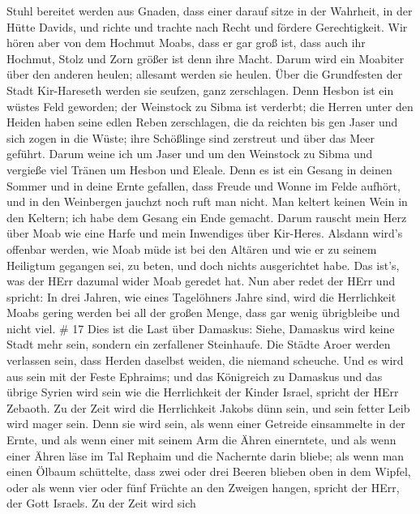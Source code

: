 Stuhl bereitet werden aus Gnaden, dass einer darauf sitze in der
Wahrheit, in der Hütte Davids, und richte und trachte nach Recht und
fördere Gerechtigkeit.  Wir hören aber von dem Hochmut
Moabs, dass er gar groß ist, dass auch ihr Hochmut, Stolz und Zorn
größer ist denn ihre Macht.  Darum wird ein Moabiter über
den anderen heulen; allesamt werden sie heulen. Über die Grundfesten der
Stadt Kir-Hareseth werden sie seufzen, ganz zerschlagen. 
Denn Hesbon ist ein wüstes Feld geworden; der Weinstock zu Sibma ist
verderbt; die Herren unter den Heiden haben seine edlen Reben
zerschlagen, die da reichten bis gen Jaser und sich zogen in die Wüste;
ihre Schößlinge sind zerstreut und über das Meer geführt. 
Darum weine ich um Jaser und um den Weinstock zu Sibma und vergieße viel
Tränen um Hesbon und Eleale. Denn es ist ein Gesang in deinen Sommer und
in deine Ernte gefallen,  dass Freude und Wonne im Felde
aufhört, und in den Weinbergen jauchzt noch ruft man nicht. Man keltert
keinen Wein in den Keltern; ich habe dem Gesang ein Ende gemacht.
 Darum rauscht mein Herz über Moab wie eine Harfe und mein
Inwendiges über Kir-Heres.  Alsdann wird's offenbar werden,
wie Moab müde ist bei den Altären und wie er zu seinem Heiligtum
gegangen sei, zu beten, und doch nichts ausgerichtet habe. 
Das ist's, was der HErr dazumal wider Moab geredet hat. 
Nun aber redet der HErr und spricht: In drei Jahren, wie eines
Tagelöhners Jahre sind, wird die Herrlichkeit Moabs gering werden bei
all der großen Menge, dass gar wenig übrigbleibe und nicht viel. \# 17
 Dies ist die Last über Damaskus: Siehe, Damaskus wird keine
Stadt mehr sein, sondern ein zerfallener Steinhaufe.  Die
Städte Aroer werden verlassen sein, dass Herden daselbst weiden, die
niemand scheuche.  Und es wird aus sein mit der Feste
Ephraims; und das Königreich zu Damaskus und das übrige Syrien wird sein
wie die Herrlichkeit der Kinder Israel, spricht der HErr Zebaoth.
 Zu der Zeit wird die Herrlichkeit Jakobs dünn sein, und
sein fetter Leib wird mager sein.  Denn sie wird sein, als
wenn einer Getreide einsammelte in der Ernte, und als wenn einer mit
seinem Arm die Ähren einerntete, und als wenn einer Ähren läse im Tal
Rephaim  und die Nachernte darin bliebe; als wenn man einen
Ölbaum schüttelte, dass zwei oder drei Beeren blieben oben in dem
Wipfel, oder als wenn vier oder fünf Früchte an den Zweigen hangen,
spricht der HErr, der Gott Israels.  Zu der Zeit wird sich

